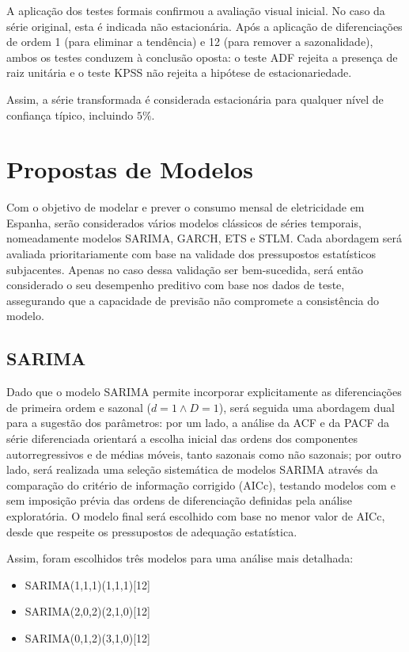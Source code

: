 \documentclass[journal]{IEEEtran}
\begin{document}
A aplicação dos testes formais confirmou a avaliação visual inicial. No caso da série original, esta é indicada não estacionária. Após a aplicação de diferenciações de ordem 1 (para eliminar a tendência) e 12 (para remover a sazonalidade), ambos os testes conduzem à conclusão oposta: o teste ADF rejeita a presença de raiz unitária e o teste KPSS não rejeita a hipótese de estacionariedade.

Assim, a série transformada é considerada estacionária para qualquer nível de confiança típico, incluindo $5\%$.

\section{Propostas de Modelos}

Com o objetivo de modelar e prever o consumo mensal de eletricidade em Espanha, serão considerados vários modelos clássicos de séries temporais, nomeadamente modelos SARIMA, GARCH, ETS e STLM. Cada abordagem será avaliada prioritariamente com base na validade dos pressupostos estatísticos subjacentes. Apenas no caso dessa validação ser bem-sucedida, será então considerado o seu desempenho preditivo com base nos dados de teste, assegurando que a capacidade de previsão não compromete a consistência do modelo.

\subsection{SARIMA}

Dado que o modelo SARIMA permite incorporar explicitamente as diferenciações de primeira ordem e sazonal ($d = 1 \land D = 1$), será seguida uma abordagem dual para a sugestão dos parâmetros: por um lado, a análise da ACF e da PACF da série diferenciada orientará a escolha inicial das ordens dos componentes autorregressivos e de médias móveis, tanto sazonais como não sazonais; por outro lado, será realizada uma seleção sistemática de modelos SARIMA através da comparação do critério de informação corrigido (AICc), testando modelos com e sem imposição prévia das ordens de diferenciação definidas pela análise exploratória. O modelo final será escolhido com base no menor valor de AICc, desde que respeite os pressupostos de adequação estatística.

Assim, foram escolhidos três modelos para uma análise mais detalhada:

\begin{itemize}
    \item SARIMA(1,1,1)(1,1,1)[12]
    \item SARIMA(2,0,2)(2,1,0)[12]
    \item SARIMA(0,1,2)(3,1,0)[12]
\end{itemize}
\end{document}
